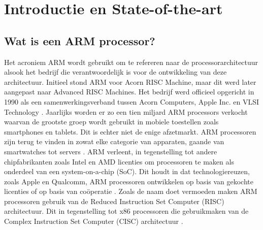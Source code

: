 
\section{Introductie en State-of-the-art} %
\label{sec:introductie}

\subsection{Wat is een ARM processor?}
Het acroniem ARM wordt gebruikt om te refereren naar de processorarchitectuur alsook het bedrijf die verantwoordelijk is voor de ontwikkeling van deze architectuur. Initieel stond ARM voor Acorn RISC Machine, maar dit werd later aangepast naar Advanced RISC Machines. Het bedrijf werd officieel opgericht in 1990 als een samenwerkingsverband tussen Acorn Computers, Apple Inc. en VLSI Technology \autocite{Walshe2015}. Jaarlijks worden er zo een tien miljard ARM processors verkocht waarvan de grootste groep wordt gebruikt in mobiele toestellen zoals smartphones en tablets. Dit is echter niet de enige afzetmarkt. ARM processoren zijn terug te vinden in zowat elke categorie van apparaten, gaande van smartwatches tot servers \autocite{Harris2015}. ARM verleent, in tegenstelling tot andere chipfabrikanten zoals Intel en AMD licenties om processoren te maken als onderdeel van een system-on-a-chip (SoC). Dit houdt in dat technologiereuzen, zoals Apple en Qualcomm, ARM processoren ontwikkelen op basis van gekochte licenties of op basis van coöperatie \autocite{Asghar2020}. Zoals de naam doet vermoeden maken ARM processoren gebruik van de Reduced Instruction Set Computer (RISC) architectuur. Dit in tegenstelling tot x86 processoren die gebruikmaken van de Complex Instruction Set Computer (CISC) architectuur \autocite{Harris2015}.

